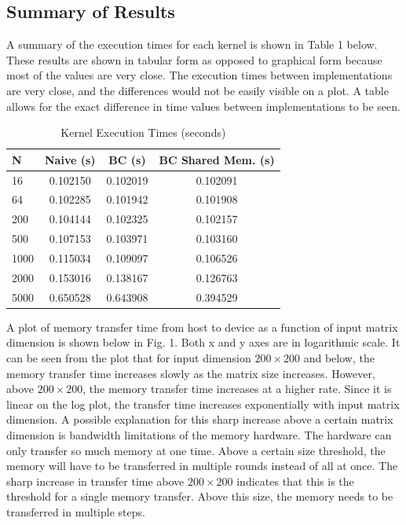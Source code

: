 \documentclass{article}
\begin{document}
\subsection{Summary of Results}
A summary of the execution times for each kernel is shown in Table 1 below. These results are shown in tabular form as opposed to graphical form because most of the values are very close. The execution times between implementations are very close, and the differences would not be easily visible on a plot. A table allows for the exact difference in time values between implementations to be seen.
\begin{table}[htbp]
	\centering
	\caption{Kernel Execution Times (seconds)}
	\label{tab:academic}
	\begin{tabular}{lccc}
		\toprule
		\textbf{N} & \textbf{Naive (s)} & \textbf{BC (s)} & \textbf{BC Shared Mem. (s)}   \\ \midrule
		16         & 0.102150           & 0.102019        & 0.102091 \\
		64         & 0.102285           & 0.101942        & 0.101908 \\
		200        & 0.104144           & 0.102325        & 0.102157 \\
		500        & 0.107153           & 0.103971        & 0.103160 \\
		1000       & 0.115034           & 0.109097        & 0.106526 \\
		2000       & 0.153016           & 0.138167        & 0.126763 \\
		5000       & 0.650528           & 0.643908        & 0.394529 \\ \bottomrule
	\end{tabular}
\end{table}

A plot of memory transfer time from host to device as a function of input matrix dimension is shown below in Fig. 1. Both x and y axes are in logarithmic scale. It can be seen from the plot that for input dimension $200\times 200$ and below, the memory transfer time increases slowly as the matrix size increases. However, above $200\times 200$, the memory transfer time increases at a higher rate. Since it is linear on the log plot, the transfer time increases exponentially with input matrix dimension. A possible explanation for this sharp increase above a certain matrix dimension is bandwidth limitations of the memory hardware. The hardware can only transfer so much memory at one time. Above a certain size threshold, the memory will have to be transferred in multiple rounds instead of all at once. The sharp increase in transfer time above $200\times 200$ indicates that this is the threshold for a single memory transfer. Above this size, the memory needs to be transferred in multiple steps.
\end{document}
